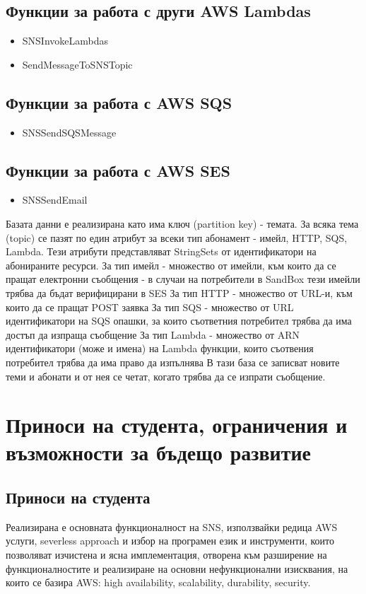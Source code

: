 \documentclass[12pt]{article}
\begin{document}
\subsection{Функции за работа с други AWS Lambdas}
\begin{itemize}
  \item SNSInvokeLambdas
  \item SendMessageToSNSTopic
\end{itemize}

\subsection{Функции за работа с AWS SQS}
\begin{itemize}
  \item SNSSendSQSMessage
\end{itemize}

\subsection{Функции за работа с AWS SES}
\begin{itemize}
  \item SNSSendEmail
\end{itemize}

\medskip

Базата данни е реализирана като има ключ (partition key) - темата.
За всяка тема (topic) се пазят по един атрибут за всеки тип абонамент -
имейл, HTTP, SQS, Lambda.
Тези атрибути представляват StringSets от идентификатори на абонираните ресурси.
За тип имейл - множество от имейли, към които да се пращат електронни съобщения -
в случаи на потребители в SandBox тези имейли трябва да бъдат верифицирани в SES
За тип HTTP - множество от URL-и, към които да се пращат POST заявка 
За тип SQS - множество от URL идентификатори на SQS опашки, за които съответния
потребител трябва да има достъп да изпраща съобщение
За тип Lambda - множество от ARN идентификатори (може и имена) на Lambda функции, 
които съотвения потребител трябва да има право да изпълнява
В тази база се записват новите теми и абонати и от нея се четат, когато трябва да се
изпрати съобщение.


\section{Приноси на студента, ограничения и възможности за бъдещо развитие}

\subsection{Приноси на студента}
Реализирана е основната функционалност на SNS, използвайки редица AWS услуги,
severless approach и избор на програмен език и инструменти, които позволяват 
изчистена и ясна имплементация, отворена към разширение на функционалностите и 
реализиране на основни нефункционални изисквания, на които се базира AWS: 
high availability, scalability, durability, security.
\end{document}

